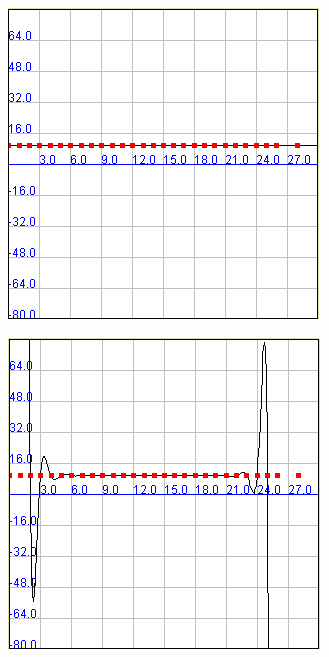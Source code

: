 \documentclass[a4paper]{article}
\begin{document}
\begin{figure}[h!]
	\caption{}
	\begin{center}
	\includegraphics[scale=1]{imagenes/SplinesX12a101}
	\label{SplinesX12a101}
  \end{center}
\end{figure}

\begin{figure}
	\caption{}
	\begin{center}
	\includegraphics[scale=1]{imagenes/LagrangeX12a101}
	\label{LagrangeX12a101}
  \end{center}
\end{figure}
\end{document}
